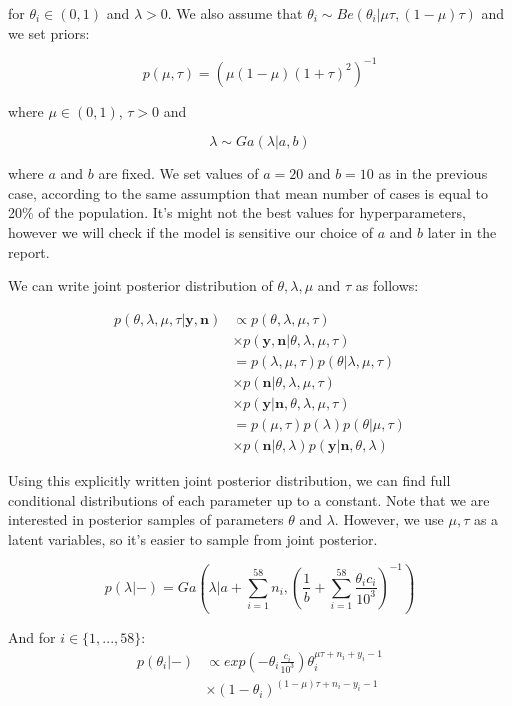 \documentclass[11pt,twocolumn]{asaproc}
\begin{document}
for $\theta_i \in (0,1)$ and $\lambda>0$.  We also assume that $\theta_i \sim Be(\theta_i| \mu\tau, (1-\mu)\tau)$ and we set priors:

$$p(\mu, \tau) = (\mu(1-\mu)(1+\tau)^2)^{-1}$$ 

where $\mu \in (0,1)$, $\tau>0$ and 

$$\lambda \sim Ga(\lambda|a, b)$$

where $a$ and $b$ are fixed. We set values of $a = 20$ and $b = 10$ as in the previous case, according to the same assumption that mean number of cases is equal to 20\% of the population. It's might not the best values for hyperparameters, however we will check if the model is sensitive our choice of $a$ and $b$ later in the report.


We can write joint posterior distribution of $\theta, \lambda, \mu$ and $\tau$ as follows:

\begin{align*}
p(\theta, \lambda, \mu, \tau |\mathbf{y}, \mathbf{n} ) & \propto  p(\theta, \lambda, \mu, \tau) \\
& \times p(\mathbf{y}, \mathbf{n} |\theta, \lambda , \mu, \tau) \\
& = p(\lambda, \mu, \tau) p(\theta | \lambda, \mu, \tau) \\
& \times p(\mathbf{n} | \theta, \lambda, \mu, \tau) \\
& \times p(\mathbf{y}| \mathbf{n}, \theta, \lambda, \mu, \tau) \\
& = p(\mu, \tau) p(\lambda) p(\theta|\mu, \tau) \\
& \times p(\mathbf{n}| \theta, \lambda) p(\mathbf{y} | \mathbf{n}, \theta, \lambda)
\end{align*}

Using this explicitly written joint posterior distribution, we can find full conditional distributions of each parameter up to a constant. Note that we are interested in posterior samples of parameters $\theta$ and $\lambda$. However, we use $\mu, \tau$ as a latent variables, so it's easier to sample from joint posterior. 

$$p(\lambda | -) = Ga(\lambda |a + \sum_{i=1}^{58}n_i, (\frac{1}{b} + \sum_{i=1}^{58}\frac{\theta_i c_i}{10^3})^{-1})$$

And for $i \in \{1, ..., 58\}$:
\begin{align*}
p(\theta_i| - ) & \propto exp(-\theta_i\frac{ c_i}{10^3}) \theta_i^{\mu\tau + n_i + y_i - 1}\\
& \times (1-\theta_i)^{(1-\mu)\tau + n_i - y_i - 1}
\end{align*}
\end{document}
